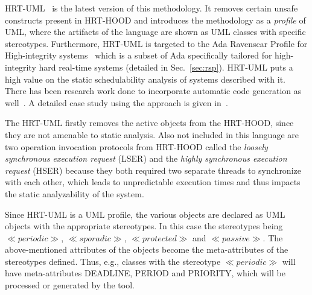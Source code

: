 HRT-UML~\cite{mazzini@ae03} is the latest version of this
methodology. It removes certain unsafe constructs present in HRT-HOOD
and introduces the methodology as a \emph{profile} of UML, where the
artifacts of the language are shown as UML classes with specific
stereotypes. Furthermore, HRT-UML is targeted to the Ada Ravenscar
Profile for High-integrity systems~\cite{burns@adalett04} which is a
subset of Ada specifically tailored for high-integrity hard real-time
systems (detailed in Sec.~\ref{sec:rsp}). HRT-UML puts a high value on
the static schedulability analysis of systems described with it. There
has been research work done to incorporate automatic code generation
as well~\cite{vardanega@ecrts05}. A detailed case study using the
approach is given in~\cite{silvia-hrt-uml-cs}.

The HRT-UML firstly removes the active objects from the HRT-HOOD,
since they are not amenable to static analysis. Also not included in
this language are two operation invocation protocols from HRT-HOOD
called the \emph{loosely synchronous execution request} (LSER) and the
\emph{highly synchronous execution request} (HSER) because they both
required two separate threads to synchronize with each other, which
leads to unpredictable execution times and thus impacts the static
analyzability of the system.

Since HRT-UML is a UML profile, the various objects are declared as
UML objects with the appropriate stereotypes. In this case the
stereotypes being $\ll periodic\gg$, $\ll sporadic\gg$, $\ll
protected\gg$ and $\ll passive\gg$. The above-mentioned attributes of
the objects become the meta-attributes of the stereotypes
defined. Thus, e.g., classes with the stereotype $\ll periodic\gg$
will have meta-attributes DEADLINE, PERIOD and PRIORITY, which will be
processed or generated by the tool.

